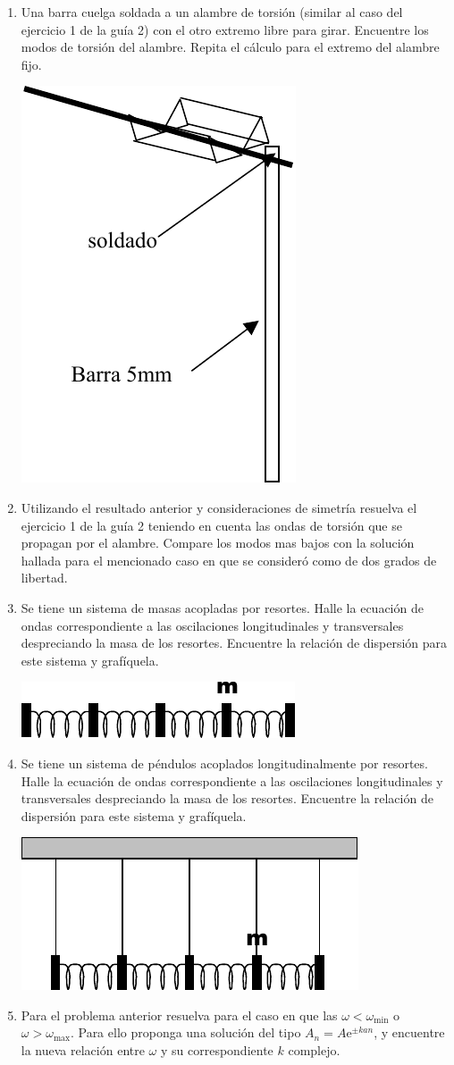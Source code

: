 \documentclass[11pt,spanish,a4paper]{article}
\begin{document}
\begin{enumerate}
\item Una barra cuelga soldada a un alambre de torsión (similar al caso del ejercicio 1 de la guía 2) con el otro extremo libre para girar.
	Encuentre los modos de torsión del alambre.
	Repita el cálculo para el extremo del alambre fijo.
\begin{center}
	\includegraphics[width=0.15\linewidth]{g04e05}
\end{center}



\item Utilizando el resultado anterior y consideraciones de simetría resuelva el ejercicio 1 de la guía 2 teniendo en cuenta las ondas de torsión que se propagan por el alambre.
	Compare los modos mas bajos con la solución hallada para el mencionado caso en que se consideró como de dos grados de libertad.


\item Se tiene un sistema de masas acopladas por resortes.
	Halle la ecuación de ondas correspondiente a las oscilaciones longitudinales y transversales despreciando la masa de los resortes.
	Encuentre la relación de dispersión para este sistema y grafíquela.
\begin{center}
	\includegraphics[width=0.25\linewidth]{g04e07}
\end{center}


\item Se tiene un sistema de péndulos acoplados longitudinalmente por resortes.
	Halle la ecuación de ondas correspondiente a las oscilaciones longitudinales y transversales despreciando la masa
	de los resortes.
	Encuentre la relación de dispersión para este sistema y grafíquela.
\begin{center}
	\includegraphics[width=0.25\linewidth]{g04e08}
\end{center}


\item Para el problema anterior resuelva para el caso en que las \(\omega< \omega_\mathrm{min}\) o \(\omega> \omega_\mathrm{max} \).
		Para ello proponga una solución del tipo \(A_n= A \mathrm{e}^{\pm kan} \), y encuentre la nueva relación entre \(\omega\) y su correspondiente \(k\) complejo.

\end{enumerate}
\end{document}
